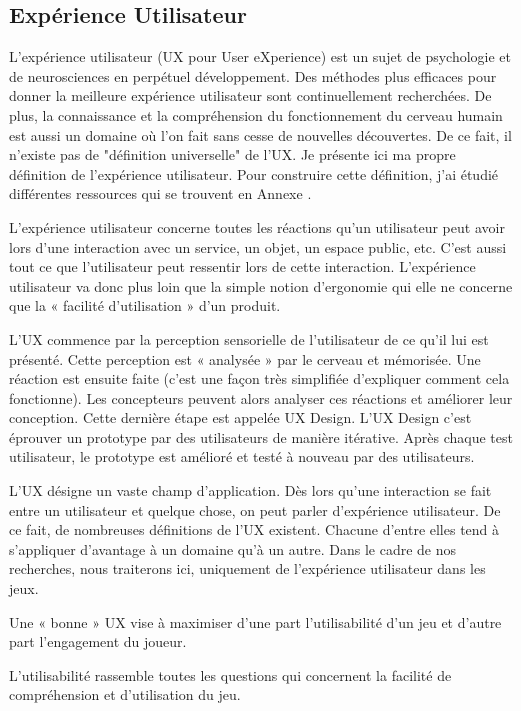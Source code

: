 \documentclass{article}
\begin{document}
	\subsection{Expérience Utilisateur}\label{sec:UX}
		L'expérience utilisateur (UX pour User eXperience) est un sujet de psychologie et de neurosciences en perpétuel développement.
		Des méthodes plus efficaces pour donner la meilleure expérience utilisateur sont continuellement recherchées. 
		De plus, la connaissance et la compréhension du fonctionnement du cerveau humain est aussi un domaine où l'on fait sans cesse de nouvelles découvertes.
		De ce fait, il n'existe pas de "définition universelle" de l'UX.
		Je présente ici ma propre définition de l'expérience utilisateur.
		Pour construire cette définition, j'ai étudié différentes ressources qui se trouvent en Annexe \cite{ann:ux}.\par
		L’expérience utilisateur concerne toutes les réactions qu’un utilisateur peut avoir lors d’une interaction avec un service, un objet, un espace public, etc.
		C’est aussi tout ce que l’utilisateur peut ressentir lors de cette interaction.
		L’expérience utilisateur va donc plus loin que la simple notion d’ergonomie qui elle ne concerne que la « facilité d’utilisation » d’un produit.\par
		L’UX commence par la perception sensorielle de l’utilisateur de ce qu’il lui est présenté. 
		Cette perception est « analysée » par le cerveau et mémorisée.
		Une réaction est ensuite faite (c'est une façon très simplifiée d'expliquer comment cela fonctionne).
		Les concepteurs peuvent alors analyser ces réactions et améliorer leur conception.
		Cette dernière étape est appelée UX Design.
		L’UX Design c’est éprouver un prototype par des utilisateurs de manière itérative.
		Après chaque test utilisateur, le prototype est amélioré et testé à nouveau par des utilisateurs.\par
		L’UX désigne un vaste champ d’application.
		Dès lors qu’une interaction se fait entre un utilisateur et quelque chose, on peut parler d’expérience utilisateur.
		De ce fait, de nombreuses définitions de l’UX existent.
		Chacune d’entre elles tend à s’appliquer d’avantage à un domaine qu’à un autre.
		Dans le cadre de nos recherches, nous traiterons ici, uniquement de l’expérience utilisateur dans les jeux.\par
		Une « bonne » UX vise à maximiser d’une part l’utilisabilité d’un jeu et d’autre part l’engagement du joueur.\par
		L’utilisabilité rassemble toutes les questions qui concernent la facilité de compréhension et d'utilisation du jeu.
\end{document}
